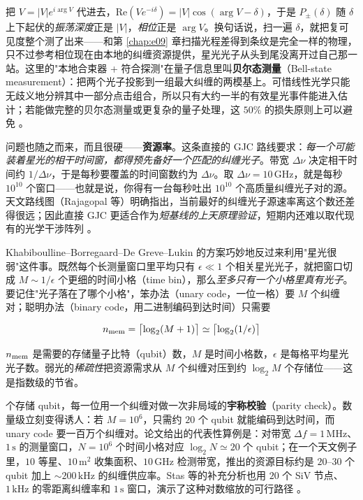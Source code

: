 把 \(V=|V|e^{i\arg V}\) 代进去，\(\mathrm{Re}(Ve^{-i\delta})=|V|\cos(\arg V-\delta)\)，于是 \(P_\pm(\delta)\) 随 \(\delta\) 上下起伏的\emph{振荡深度}正是 \(|V|\)，\emph{相位}正是 \(\arg V\)。换句话说，扫一遍 \(\delta\)，就把复可见度整个测了出来——和第 \ref{chap:e09} 章扫描光程差得到条纹是完全一样的物理，只不过参考相位现在由本地的纠缠资源提供，星光光子从头到尾没离开过自己那一站。这里的"本地合束器 + 符合探测"在量子信息里叫\textbf{贝尔态测量}（Bell-state measurement）：把两个光子投影到一组最大纠缠的两模基上。可惜线性光学只能无歧义地分辨其中一部分点击组合，所以只有大约一半的有效星光事件能进入估计；若能做完整的贝尔态测量或更复杂的量子处理，这 \(50\%\) 的损失原则上可以避免 \citep{1982Natur.299..802W,1993PhRvL..70.1895B,2012PhRvL.109g0503G}。

问题也随之而来，而且很硬——\textbf{资源率}。这条直接的 GJC 路线要求：\emph{每一个可能装着星光的相干时间窗，都得预先备好一个匹配的纠缠光子}。带宽 \(\Delta\nu\) 决定相干时间约 \(1/\Delta\nu\)，于是每秒要覆盖的时间窗数约为 \(\Delta\nu\)。取 \(\Delta\nu=10\,\mathrm{GHz}\)，就是每秒 \(10^{10}\) 个窗口——也就是说，你得有一台每秒吐出 \(10^{10}\) 个高质量纠缠光子对的源。天文路线图（Rajagopal 等）明确指出，当前最好的纠缠光子源速率离这个数还差得很远；因此直接 GJC 更适合作为\emph{短基线的上天原理验证}，短期内还难以取代现有的光学干涉阵列 \citep{2024SPIE13095E..1NR,2012PhRvL.109g0503G}。

Khabiboulline--Borregaard--De Greve--Lukin 的方案巧妙地反过来利用"星光很弱"这件事。既然每个长测量窗口里平均只有 \(\epsilon\ll1\) 个相关星光光子，就把窗口切成 \(M\sim1/\epsilon\) 个更细的时间小格（time bin），那么\emph{至多只有一个小格里真有光子}。要记住"光子落在了哪个小格"，笨办法（unary code，一位一格）要 \(M\) 个纠缠对；聪明办法（binary code，用二进制编码到达时间）只需要

\begin{equation}
  n_{\rm mem}
  =
  \bigl\lceil\log_2(M+1)\bigr\rceil
  \simeq
  \bigl\lceil\log_2(1/\epsilon)\bigr\rceil
  \label{eq:e24-binary-timebin}
\end{equation}
\begin{formulaexplain}
\(n_{\rm mem}\) 是需要的存储量子比特（qubit）数，\(M\) 是时间小格数，\(\epsilon\) 是每格平均星光光子数。弱光的\emph{稀疏性}把资源需求从 \(M\) 个纠缠对压到约 \(\log_2 M\) 个存储位——这是指数级的节省。
\end{formulaexplain}

个存储 qubit，每一位用一个纠缠对做一次非局域的\textbf{宇称校验}（parity check）。数量级立刻变得诱人：若 \(M=10^6\)，只需约 \(20\) 个 qubit 就能编码到达时间，而 unary code 要一百万个纠缠对。论文给出的代表性算例是：对带宽 \(\Delta f=1\,\mathrm{MHz}\)、\(1\,\mathrm{s}\) 的测量窗口，\(N=10^6\) 个时间小格对应 \(\log_2 N\simeq20\) 个 qubit；在一个天文例子里，\(10\) 等星、\(10\,\mathrm{m^2}\) 收集面积、\(10\,\mathrm{GHz}\) 检测带宽，推出的资源目标约是 \(20\)–\(30\) 个 qubit 加上 \(\sim200\,\mathrm{kHz}\) 的纠缠供应率。Stas 等的补充分析也用 \(20\) 个 SiV 节点、\(1\,\mathrm{kHz}\) 的零距离纠缠率和 \(1\,\mathrm{s}\) 窗口，演示了这种对数缩放的可行路径 \citep{2019PhRvL.123g0504K,2022PhRvA.106c2424C,2026Natur.651..326S,2024SPIE13095E..1NR}。

